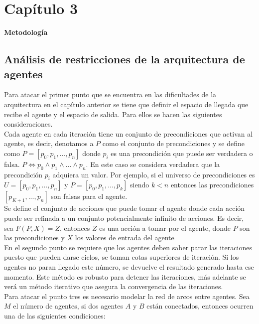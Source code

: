 \documentclass{article}
\begin{document}
\newpage

\section*{ \Huge Capítulo 3} 
    \large \textbf{ Metodología }
    \label{sec:15}

    \subsection*{ \Large Análisis de restricciones de la arquitectura de agentes} 
        
        Para atacar el primer punto que se encuentra en las dificultades de la arquitectura en el capítulo anterior se tiene que definir el espacio de llegada que recibe el agente y el espacio de salida. Para ellos se hacen las siguientes consideraciones.\\
        
        Cada agente en cada iteración tiene un conjunto de precondiciones que activan al agente, es decir, denotamos a $P$ como el conjunto de precondiciones y se define como $P=[ p_0,p_1,...,p_n]$ donde $p_i$ es una precondición que puede ser verdadera o falsa. $P \iff p_0 \land p_1 \land...\land p_n$. En este caso se considera verdadera que la precondición $p_i$ adquiera un valor. Por ejemplo, si el universo de precondiciones es $U=[p_0,p_1,...,p_n]$ y $P=[p_0,p_1,...,p_k]$ siendo $k<n$ entonces las precondiciones $[p_{K+1},...,p_n]$ son falsas para el agente. \\

        Se define el conjunto de acciones que puede tomar el agente donde cada acción puede ser refinada a un conjunto potencialmente infinito de acciones. Es decir, sea $F(P,X)=Z$, entonces $Z$ es una acción a tomar por el agente, donde $P$ son las precondiciones y $X$ los valores de entrada del agente \\

        En el segundo punto se requiere que los agentes deben saber parar las iteraciones puesto que pueden darse ciclos, se toman cotas superiores de iteración. Si los agentes no paran llegado este número, se devuelve el resultado generado hasta ese momento. Este método es robusto para detener las iteraciones, más adelante se verá un método iterativo que asegura la convergencia de las iteraciones. \\

        Para atacar el punto tres es necesario modelar la red de arcos entre agentes. Sea $M$ el número de agentes, si dos agentes $A$ y $B$ están conectados, entonces ocurren una de las siguientes condiciones:
        
\end{document}
